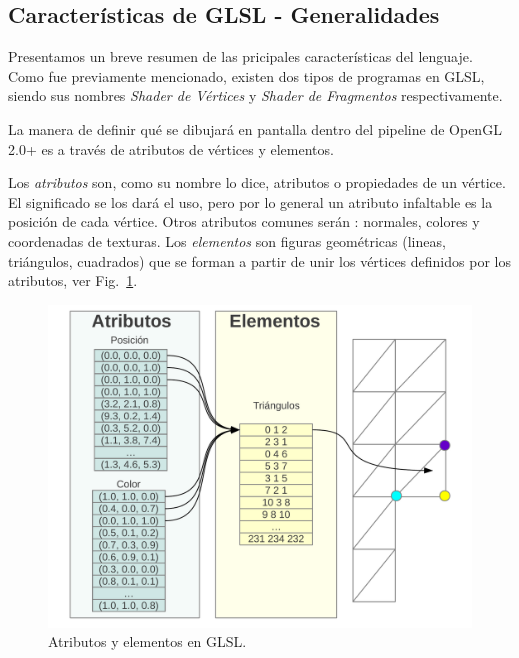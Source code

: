 
\subsection{Caracter\'isticas de GLSL - Generalidades}
Presentamos un breve resumen de las pricipales caracter\'isticas del lenguaje.
Como fue previamente mencionado, existen dos tipos de programas en GLSL, siendo sus nombres {\em Shader de Vértices} y {\em Shader de Fragmentos} respectivamente.

La manera de definir qué se dibujará en pantalla dentro del pipeline de OpenGL 2.0+  es a través de atributos de vértices y elementos. 


Los \emph{atributos} son, como su nombre lo dice, atributos o propiedades de un vértice. El significado se los dará el uso, pero por lo general un atributo infaltable es la posición de cada vértice. Otros atributos comunes serán : normales, colores y coordenadas de texturas.
Los \emph{elementos} son figuras geométricas (lineas, triángulos, cuadrados) que se forman a partir de unir los vértices definidos por los atributos, ver Fig.~\ref{fg:atributos}.

\begin{figure}[h]
\begin{center}
\includegraphics[width=13cm]{figures/atributos}
\end{center}
\caption{Atributos y elementos en GLSL.}
\label{fg:atributos}
\end{figure}

